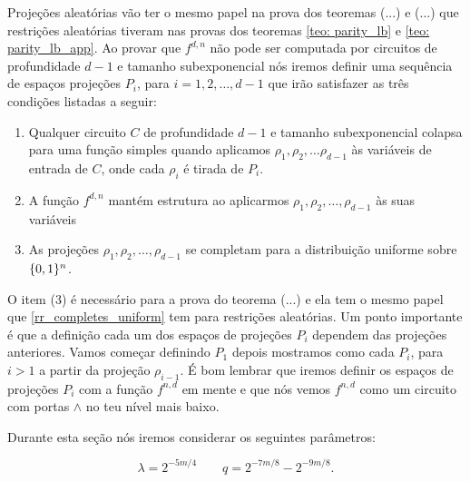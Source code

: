 Projeções aleatórias vão ter o mesmo papel na prova dos teoremas (...) e (...) que restrições aleatórias tiveram nas provas dos teoremas \ref{teo: parity_lb} e \ref{teo: parity_lb_app}. Ao provar que $f^{d, n}$ não pode ser computada por circuitos de profundidade $d - 1$ e tamanho subexponencial nós iremos definir uma sequência de espaços projeções $P_{i}$, para $i = 1, 2, \dots, d - 1$ que irão satisfazer as três condições listadas a seguir:

\begin{enumerate}

	\item Qualquer circuito $C$ de profundidade $d - 1$ e tamanho subexponencial colapsa para uma função simples quando aplicamos $\rho_{1}, \rho_{2}, \dots \rho_{d - 1}$ às variáveis de entrada de $C$, onde cada $\rho_{i}$ é tirada de $P_{i}$.
	
	\item A função $f^{d, n}$ mantém estrutura ao aplicarmos $\rho_{1}, \rho_{2}, \dots, \rho_{d - 1}$ às suas variáveis
	\item As projeções $\rho_{1}, \rho_{2}, \dots, \rho_{d - 1}$ se completam para a distribuição uniforme sobre $\{0, 1\}^{n}$.

\end{enumerate}
O item (3) é necessário para a prova do teorema (...) e ela tem o mesmo papel que \ref{rr_completes_uniform} tem para restrições aleatórias. Um ponto importante é que a definição cada um dos espaços de projeções $P_{i}$ dependem das projeções anteriores. Vamos começar definindo $P_{1}$ depois mostramos como cada $P_{i}$, para $i > 1$ a partir da projeção $\rho_{i - 1}$. É bom lembrar que iremos definir os espaços de projeções $P_{i}$ com a função $f^{n, d}$ em mente e que nós vemos $f^{n, d}$ como um circuito com portas $\land$ no teu nível mais baixo.

Durante esta seção nós iremos considerar os seguintes parâmetros:

\begin{equation} \label{lambda_q_defi}
	\lambda = 2^{-5m/4} \qquad q = 2^{-7m/8} - 2^{-9m/8}.
\end{equation}

